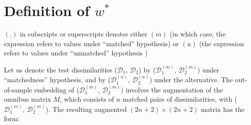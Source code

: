 \documentclass[12pt]{article} %
\newenvironment{remark}[1][Remark]{\begin{trivlist}
\item[\hskip \labelsep {\bfseries #1}]}{\end{trivlist}}
\begin{document}
\section{Definition of  $w^{*}$}

\begin{remark}
$(.)$ in subscripts or superscripts  denotes  either $(m)$ (in which case, the expression refers to values under  ``matched'' hypothesis)  or   $(u)$  (the expression refers to values under  ``unmatched''   hypothesis )
\end{remark}
Let us denote the test dissimilarities ($\mathcal{D}_1$, $\mathcal{D}_2$)  by  ($\mathcal{D}_1^{(m)}$, $\mathcal{D}_2^{(m)}$)  under ``matchedness'' hypothesis, and  by ($\mathcal{D}_1^{(u)}$, $\mathcal{D}_2^{(u)}$)  under the alternative. The out-of-sample embedding of ($\mathcal{D}_1^{(m)}$, $\mathcal{D}_2^{(m)}$) involves the  augmentation of  the omnibus matrix $M$, which consists of $n$ matched  pairs of dissimilarities,  with ($\mathcal{D}_1^{(m)}$, $\mathcal{D}_2^{(m)}$). The resulting augmented  $(2n+2)\times (2n+2)$ matrix  has the form:
\end{document}
